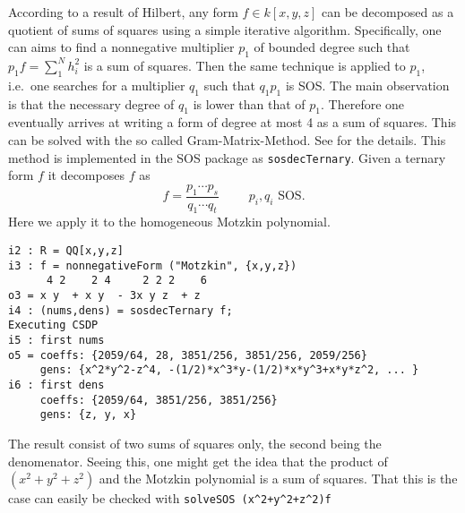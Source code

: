 \documentclass[11pt]{amsart}
\theoremstyle{plain}%
\theoremstyle{definition}
\theoremstyle{remark}
\newcommand{\SOS}{\textsc{SOS}\xspace}
\begin{document}
According to a result of Hilbert, any form $f\in k[x,y,z]$ can be decomposed as a quotient of sums of squares using a simple iterative algorithm.
Specifically, one can aims to find a nonnegative multiplier $p_{1}$ of bounded degree such that $p_{1}f = \sum_{1}^{N}h_{i}^{2}$ is a sum of squares.
Then the same technique is applied to $p_{1}$, i.e.~one searches for a multiplier $q_{1}$ such that $q_{1}p_{1}$ is SOS.
The main observation is that the necessary degree of $q_{1}$ is lower than that of $p_{1}$.
Therefore one eventually arrives at writing a form of degree at most 4 as a sum of squares.
This can be solved with the so called Gram-Matrix-Method.
See \cite{de2004products} for the details.
This method is implemented in the \SOS package as \verb|sosdecTernary|.  Given a ternary form $f$ it decomposes $f$ as
\[
  f = \frac{p_{1}\cdots p_{s}}{q_{1}\cdots q_{t}} \qquad \text {
    $p_{i},q_{i}$ SOS}.
\]
Here we apply it to the homogeneous Motzkin polynomial.
{\small
\begin{verbatim}
i2 : R = QQ[x,y,z]
i3 : f = nonnegativeForm ("Motzkin", {x,y,z})
      4 2    2 4     2 2 2    6
o3 = x y  + x y  - 3x y z  + z
i4 : (nums,dens) = sosdecTernary f;
Executing CSDP
i5 : first nums
o5 = coeffs: {2059/64, 28, 3851/256, 3851/256, 2059/256}
     gens: {x^2*y^2-z^4, -(1/2)*x^3*y-(1/2)*x*y^3+x*y*z^2, ... }
i6 : first dens
     coeffs: {2059/64, 3851/256, 3851/256}
     gens: {z, y, x}
\end{verbatim}
}
The result consist of two sums of squares only, the second being the denomenator.
Seeing this, one might get the idea that the product of $(x^{2}+y^{2}+z^{2})$ and the Motzkin polynomial is a sum of squares.
That this is the case can easily be checked with \verb|solveSOS (x^2+y^2+z^2)f|


\end{document}
